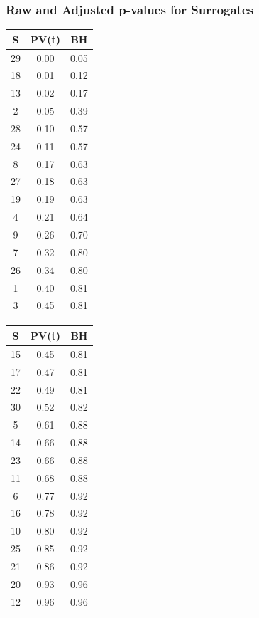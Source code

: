\documentclass[a4paper,12pt]{article}
\begin{document}
	\subsubsection*{Raw and Adjusted p-values for Surrogates}
	\begin{table}[H]
		\centering
		\begin{tabular}{ccc}
			\hline
			S & PV(t) & BH \\ 
			\hline
			29 & 0.00 & 0.05\\ 
			18 & 0.01 & 0.12\\ 
			13 & 0.02 & 0.17 \\ 
			2 & 0.05 & 0.39\\ 
			28 & 0.10 & 0.57\\ 
			24 & 0.11 & 0.57 \\ 
			8 & 0.17 & 0.63\\ 
			27 & 0.18 & 0.63\\ 
			19 & 0.19 & 0.63\\ 
			4 & 0.21 & 0.64\\ 
			9 & 0.26 & 0.70\\ 
			7 & 0.32 & 0.80\\ 
			26 & 0.34 & 0.80\\ 
			1 & 0.40 & 0.81\\ 
			3 & 0.45 & 0.81\\ 
			\hline
		\end{tabular}
		\quad
		\begin{tabular}{ccc}
			\hline
			S & PV(t) & BH\\ 
			\hline
			15 & 0.45 & 0.81\\ 
			17 & 0.47 & 0.81\\ 
			22 & 0.49 & 0.81\\ 
			30 & 0.52 & 0.82\\ 
			5 & 0.61 & 0.88\\ 
			14 & 0.66 & 0.88\\ 
			23 & 0.66 & 0.88\\ 
			11 & 0.68 & 0.88\\ 
			6 & 0.77 & 0.92 \\ 
			16 & 0.78 & 0.92\\ 
			10 & 0.80 & 0.92\\ 
			25 & 0.85 & 0.92\\ 
			21 & 0.86 & 0.92\\ 
			20 & 0.93 & 0.96\\ 
			12 & 0.96 & 0.96\\ 
			\hline
		\end{tabular}

\end{table}
\end{document}
